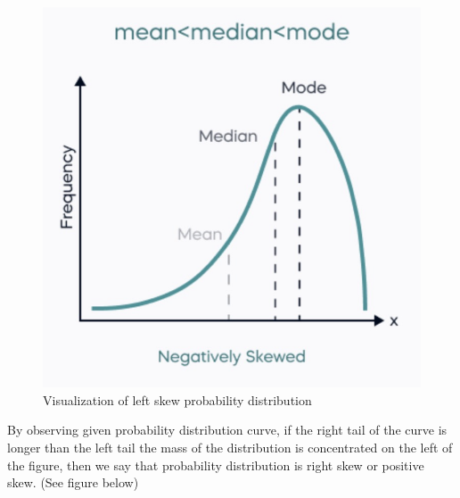 \begin{figure}[H]
 \centering
 \includegraphics[scale=0.45]{Section1/img/Leftskew.jpg}
 \caption{Visualization of left skew probability distribution}
\end{figure}

\begin{definition}
By observing given probability distribution curve, if the right tail of the curve is longer than the left tail the mass of the distribution is concentrated on the left of the figure, then we say that probability distribution is right skew or positive skew. (See figure below)
\end{definition}

